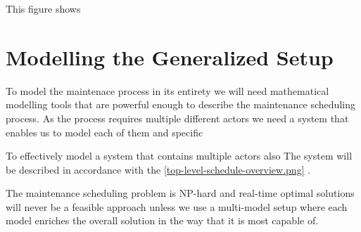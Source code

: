 This figure shows 



\chapter{Modelling the Generalized Setup}
To model the maintenace process in its entirety we will need mathematical modelling tools that are powerful enough to describe the maintenance
scheduling process. As the process requires multiple different actors we need a system that enables us to model each of them and specific   

To effectively model a system that contains multiple actors also 
The system will be described in accordance 
with the \ref{top-level-schedule-overview.png} \cite{palmer_maintenance_2019}.

The maintenance scheduling problem is NP-hard and real-time optimal solutions will never be a feasible approach unless we use a multi-model setup where each model enriches the 
overall solution in the way that it is most capable of. 

